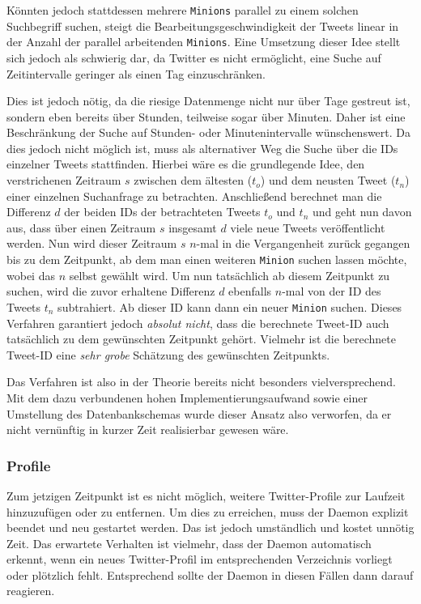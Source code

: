 Könnten jedoch stattdessen mehrere \texttt{Minions} parallel zu einem solchen Suchbegriff suchen, steigt die Bearbeitungsgeschwindigkeit der Tweets linear in der Anzahl der parallel arbeitenden \texttt{Minions}.
Eine Umsetzung dieser Idee stellt sich jedoch als schwierig dar, da Twitter es nicht ermöglicht, eine Suche auf Zeitintervalle geringer als einen Tag einzuschränken.

Dies ist jedoch nötig, da die riesige Datenmenge nicht nur über Tage gestreut ist, sondern eben bereits über Stunden, teilweise sogar über Minuten.
Daher ist eine Beschränkung der Suche auf Stunden- oder Minutenintervalle wünschenswert.
Da dies jedoch nicht möglich ist, muss als alternativer Weg die Suche über die IDs einzelner Tweets stattfinden.
Hierbei wäre es die grundlegende Idee, den verstrichenen Zeitraum $s$ zwischen dem ältesten ($t_o$) und dem neusten Tweet ($t_n$) einer einzelnen Suchanfrage zu betrachten.
Anschließend berechnet man die Differenz $d$ der beiden IDs der betrachteten Tweets $t_o$ und $t_n$ und geht nun davon aus, dass über einen Zeitraum $s$ insgesamt $d$ viele neue Tweets veröffentlicht werden.
Nun wird dieser Zeitraum $s$ $n$-mal in die Vergangenheit zurück gegangen bis zu dem Zeitpunkt, ab dem man einen weiteren \texttt{Minion} suchen lassen möchte, wobei das $n$ selbst gewählt wird.
Um nun tatsächlich ab diesem Zeitpunkt zu suchen, wird die zuvor erhaltene Differenz $d$ ebenfalls $n$-mal von der ID des Tweets $t_n$ subtrahiert. Ab dieser ID kann dann ein neuer \texttt{Minion} suchen.
Dieses Verfahren garantiert jedoch \emph{absolut nicht}, dass die berechnete Tweet-ID auch tatsächlich zu dem gewünschten Zeitpunkt gehört.
Vielmehr ist die berechnete Tweet-ID eine \emph{sehr grobe} Schätzung des gewünschten Zeitpunkts.

Das Verfahren ist also in der Theorie bereits nicht besonders vielversprechend.
Mit dem dazu verbundenen hohen Implementierungsaufwand sowie einer Umstellung des Datenbankschemas wurde dieser Ansatz also verworfen, da er nicht vernünftig in kurzer Zeit realisierbar gewesen wäre.

\subsubsection{Profile}

Zum jetzigen Zeitpunkt ist es nicht möglich, weitere Twitter-Profile zur Laufzeit hinzuzufügen oder zu entfernen.
Um dies zu erreichen, muss der Daemon explizit beendet und neu gestartet werden.
Das ist jedoch umständlich und kostet unnötig Zeit.
Das erwartete Verhalten ist vielmehr, dass der Daemon automatisch erkennt, wenn ein neues Twitter-Profil im entsprechenden Verzeichnis vorliegt oder plötzlich fehlt.
Entsprechend sollte der Daemon in diesen Fällen dann darauf reagieren.

